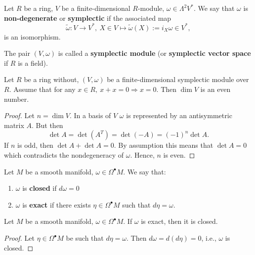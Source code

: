\begin{definition}
  Let
    $R$ be a ring,
    $V$ be a finite-dimensional $R$-module,
    $\omega \in \Lambda^2 V^*$.
  We say that $\omega$ is \textbf{non-degenerate} or \textbf{symplectic}
  if the associated map
  \begin{equation}
    \tilde{\omega} \colon V \to V^*,\
    X \in V \mapsto \tilde{\omega}(X) := i_X \omega \in V^*,
  \end{equation}
  is an isomorphism.

  The pair $(V, \omega)$ is called a \textbf{symplectic module}
  (or \textbf{symplectic vector space} if $R$ is a field).
\end{definition}
\begin{proposition}
  Let
    $R$ be a ring without,
    $(V, \omega)$ be a finite-dimensional symplectic module over $R$.
  Assume that for any $x \in R,\ x + x = 0 \Rightarrow x = 0$.
  Then $\dim V$ is an even number.
\end{proposition}
\begin{proof}
  Let $n = \dim V$.
  In a basis of $V$ $\omega$ is represented by an antisymmetric matrix $A$.
  But then
  \begin{equation}
    \det A = \det(A^T) = \det(-A) = (-1)^n \det A.
  \end{equation}
  If $n$ is odd, then $\det A + \det A = 0$.
  By assumption this means that $\det A = 0$
  which contradicts the nondegeneracy of $\omega$.
  Hence, $n$ is even.
\end{proof}
\begin{definition}
  Let $M$ be a smooth manifold, $\omega \in \Omega^\bullet M$.
  We say that:
  \begin{enumerate}
    \item
      $\omega$ is \textbf{closed} if $d \omega = 0$
    \item
      $\omega$ is \textbf{exact} if there exists $\eta \in \Omega^\bullet M$
      such that $d \eta = \omega$.
  \end{enumerate}
\end{definition}
\begin{proposition}
  Let $M$ be a smooth manifold, $\omega \in \Omega^\bullet M$.
  If $\omega$ is exact, then it is closed.
\end{proposition}
\begin{proof}
  Let $\eta \in \Omega^\bullet M$ be such that $d \eta = \omega$.
  Then $d \omega = d (d \eta) = 0$, i.e., $\omega$ is closed.
\end{proof}
